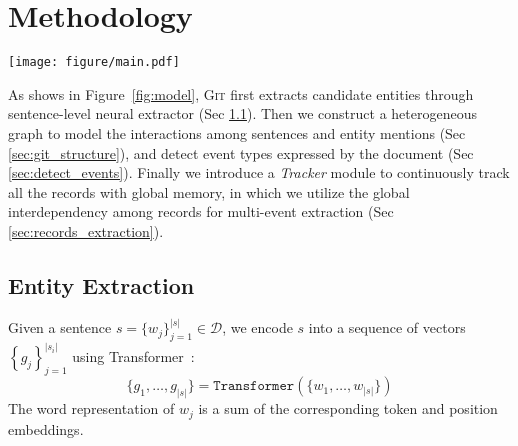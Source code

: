 \documentclass[11pt,a4paper]{article}
\newcommand{\modelname}{\textsc{Git}\xspace}
\begin{document}
 \section{Methodology}

\begin{figure*}
    \centering
    \texttt{[image: figure/main.pdf]}
    \caption{Overview of our \modelname. Firstly, sentences of the document are fed into the encoder to obtain contextualized representation, followed by a CRF layer to extract entities. Then \modelname constructs a heterogeneous graph interaction network with mention nodes and sentence nodes, which captures the global interactions among them based on GCNs.
    After obtaining document-aware representations of entities and sentences, \modelname detects event types and extracts records through the decoding module with a \textit{Tracker}. 
    The \textit{Tracker} tracks extracted records with global memory, based on which the decoding module incorporates global interdependency among correlated event records. Different entities are marked by different colors. M: Mingting Wu. X: Xiaoting Wu. N: Nov 6, 2014. S: 7.2 million.}
    \label{fig:model}
\end{figure*}

As shows in Figure~\ref{fig:model}, \modelname first extracts candidate entities through sentence-level neural extractor (Sec \ref{sec:entity_extraction}). 
Then we construct a heterogeneous graph to model the interactions among sentences and entity mentions  (Sec  \ref{sec:git_structure}), and detect event types expressed by the document (Sec \ref{sec:detect_events}).
Finally we introduce a \textit{Tracker} module to continuously track all the records with global memory, in which we utilize the global interdependency among records for multi-event extraction (Sec \ref{sec:records_extraction}).

\subsection{Entity Extraction}
\label{sec:entity_extraction}

Given a sentence $s = \{ w_j \}_{j=1}^{|s|}\in \mathcal{D}$, we encode $s$ into a sequence of vectors
$\left\{g_{j}\right\}^{\left | s_i \right |}_{j=1}$ using Transformer~\citep{NIPS2017_7181}:
\begin{equation*}
\{ g_{1}, \ldots, g_{|s|}\} = \texttt{Transformer}(\{ w_1, \ldots, w_{|s|} \})
\end{equation*}
The word representation of $w_j$ is a sum of the corresponding token and position embeddings. 
\end{document}
